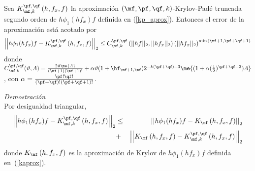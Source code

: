 \begin{lemma}\label{lemma-Krylov}
    Sea $K_{\mf,k}^{\pf,\qf}\left( h,  f_x , f \right)$ la aproximaci\'on $(\mf , \pf ,\qf , k)$-Krylov-Padé  truncada segundo orden de $h\phi_1(hf_x)f$ definida en (\ref{kp_aprox}). Entonces el error de la aproximaci\'on est\'a 
    acotado por
    \begin{equation}
    \left\lvert\left\lvert  h\phi_1(hf_x)f - 
    K_{\mf,k}^{\pf,\qf}\left( h,  f_x , f \right)\right\rvert\right\rvert_2%
     \leq C_{\mf,k}^{\pf,\qf}\left(\lvert\lvert hf \rvert\rvert_2, \lvert\lvert hf_x \rvert\rvert_2\right)
    \left(\lvert\lvert hf_x \rvert\rvert_2\right)^{\mathrm{min}\left\{ \mf+1,\pf+\qf+1 \right\}}
    \end{equation}
    donde $C_{\mf,k}^{\pf,\qf}(\vartheta,\varLambda)=\frac{2\vartheta\me{\varLambda}}{(\mf+1)(\mf+1)!}+
    \alpha\vartheta(1+\hf_{\mf+1,\mf}) 2^{-k(\pf+\qf)+3}\me{(1+\alpha(\frac{1}{2})^{\pf+\qf-3})\varLambda }$, 
    con $\alpha=\frac{\pf!\qf!}{(\pf+\qf)!(\pf+\qf+1)!}$.
\end{lemma}
\emph{Demostraci\'on} \\
Por desigualdad triangular,
\begin{eqnarray}\label{importatdeq}
\left\lvert\left\lvert  h\phi_1(hf_x)f-  K_{\mf,k}^{\pf,\qf}\left( h,  f_x , f \right)\right\rvert\right\rvert_2
&\leq&\left\lvert\left\lvert  h\phi_1(hf_x)f -  K_{\mf}\left( h,f_x , f \right) \right\rvert\right\rvert_2 \\ 
&+&\left\lvert\left\lvert  K_{\mf}\left( h,f_x , f \right) - 
K_{\mf,k}^{\pf,\qf}\left( h,  f_x , f \right)\right\rvert\right\rvert_2\nonumber
\end{eqnarray}
donde $K_{\mf}\left( h,f_x , f \right)$ es la aproximaci\'on de Krylov de $h\phi_1(hf_x)f$ definida en~(\ref{kaprox}).

